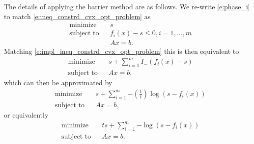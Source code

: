 \documentclass[11pt]{amsart}
\theoremstyle{definition}
\theoremstyle{remark}
\begin{document}
        The details of applying the barrier method are as follows. We re-write \eqref{e:phase_i} to match \eqref{e:ineq_constrd_cvx_opt_problem} as 
        \begin{equation}\label{e:phase_i_ineq_constrd_cvx_opt_problem}
            \begin{aligned}
            & {\text{minimize}} && s  \\
            & \text{subject to} && f_i(x) - s \leq 0, i = 1, \dots, m \\
            & && Ax = b.
            \end{aligned}
        \end{equation}
        Matching \eqref{e:impl_ineq_constrd_cvx_opt_problem} this is then equivalent to
        \begin{equation}\label{e:phase_i_impl_ineq_constrd_cvx_opt_problem}
            \begin{aligned}
            & {\text{minimize}} && s + \sum_{i=1}^{m}{I_{-}(f_i(x)-s)} \\
            & \text{subject to} && Ax = b,
            \end{aligned}
        \end{equation}
        which can then be approximated by 
        \begin{equation}\label{e:phase_i_ineq_constrd_cvx_opt_problem_approx_equiv}
            \begin{aligned}
            & {\text{minimize}} && 
            s + \sum_{i=1}^{m}{-\left(\frac{1}{t}\right)\log(s-f_i(x))}  \\
            & \text{subject to} && Ax = b,
            \end{aligned}
        \end{equation}
        or equivalently
        \begin{equation}\label{e:phase_i_ineq_constrd_cvx_opt_problem_approx}
            \begin{aligned}
            & {\text{minimize}} && 
            ts + \sum_{i=1}^{m}{-\log(s-f_i(x))}  \\
            & \text{subject to} && Ax = b.
            \end{aligned}
        \end{equation}
\end{document}
